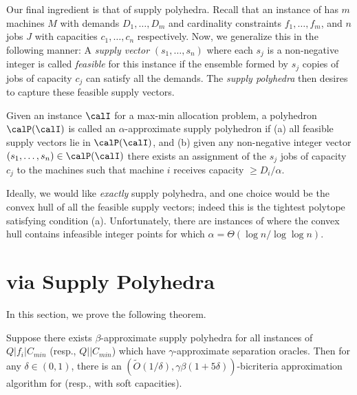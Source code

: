 Our final ingredient is that of supply polyhedra. Recall that an instance of  \cckp has $m$ machines $M$ with demands $D_1,\ldots,D_m$ and cardinality constraints $f_1,\ldots, f_m$, and $n$  jobs $J$ with capacities $c_1,\ldots,c_n$ respectively. Now, we generalize this in the following manner:
 A {\em supply vector} $(s_1,\ldots,s_n)$ where each $s_j$ is a non-negative integer
is called {\em feasible} for this instance if the ensemble formed by $s_j$ copies of jobs of capacity $c_j$ can satisfy all the demands.
The {\em supply polyhedra} then desires to capture these feasible supply vectors.

\begin{definition}\label{def:supp-poly}
	Given an instance $\calI$ for a max-min allocation problem, a polyhedron $\calP(\calI)$ is called an $\alpha$-approximate supply polyhedron if
	(a) all feasible supply vectors lie in $\calP(\calI)$, and (b) given any non-negative integer vector $(s_1,\ldots,s_n)\in \calP(\calI)$ there exists an assignment
	of the $s_j$ jobs of capacity $c_j$ to the machines such that machine $i$ receives capacity $\geq D_i/\alpha$.
\end{definition}

Ideally, we would like {\em exactly} supply polyhedra, and one choice would be the convex hull of all the feasible supply vectors; indeed this is the tightest polytope satisfying condition (a).
Unfortunately, there are instances of \cckp where the convex hull contains infeasible integer points for which $\alpha = \Theta(\log n/\log \log n)$.


\section{\mckc via Supply Polyhedra}\label{sec:o1}
\def\yy{y^\calT}
In this section, we prove the following theorem. %
\begin{theorem}\label{thm:reduction}
Suppose there exists $\beta$-approximate supply polyhedra  for all instances of $Q|f_i|C_{min}$ (resp., $Q||C_{min}$) which have $\gamma$-approximate separation oracles.
Then for any $\delta\in(0,1)$, there is an $\left(\tilde{O}(1/\delta),\gamma\beta(1+5\delta)\right)$-bicriteria approximation algorithm for  \mckc (resp., with soft capacities).
\end{theorem}
\noindent
	

